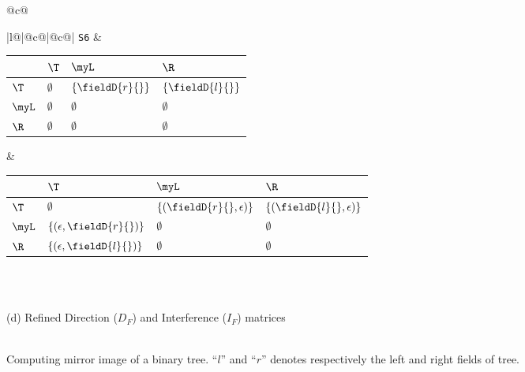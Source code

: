 \begin{figure}
{\begin{tabular}{@{}c@{}}
{\begin{tabular}[b]{|l@{}|@{}c@{}|@{}c@{}|}
{\tt S6} & 
\begin{tabular}{|p{3mm}|p{12mm}p{12mm}p{12mm}|} \hline
            & $\T$  		& $\myL$ 		& $\R$ 	 \\ \hline
  $\T$ 		& $\emptyset$	& $\{\fieldD{r}{}\}$	& $\{\fieldD{l}{}\}$ \\ \hline
  $\myL$ 	& $\emptyset$	& $\emptyset$	& $\emptyset$	\\ \hline
  $\R$ 		& $\emptyset$	& $\emptyset$	& $\emptyset$	\\ \hline
\end{tabular}
 &
\begin{tabular}{|p{3mm}|p{28mm}p{28mm}p{28mm}|} \hline
            & $\T$  		& $\myL$ 		& $\R$ 	 \\ \hline
  $\T$ 		& $\emptyset$	& $\{(\fieldD{r}{}, \epsilon)\}$	& $\{(\fieldD{l}{}, \epsilon)\}$ \\ \hline
  $\myL$ 	& $\{(\epsilon, \fieldD{r}{})\}$	& $\emptyset$	& $\emptyset$	\\ \hline
  $\R$ 		& $\{(\epsilon, \fieldD{l}{})\}$	& $\emptyset$	& $\emptyset$	\\ \hline
\end{tabular} \\ \hline
\end{tabular} 
}  \\
  \footnotesize (d) Refined Direction ($D_F$) and Interference ($I_F$) matrices  \\ \\
\end{tabular}}
\caption{Computing mirror image of a  binary tree. ``$l$'' and ``$r$'' denotes respectively the left and right fields of tree.\label{fig:benchmark_3}}
\end{figure}
